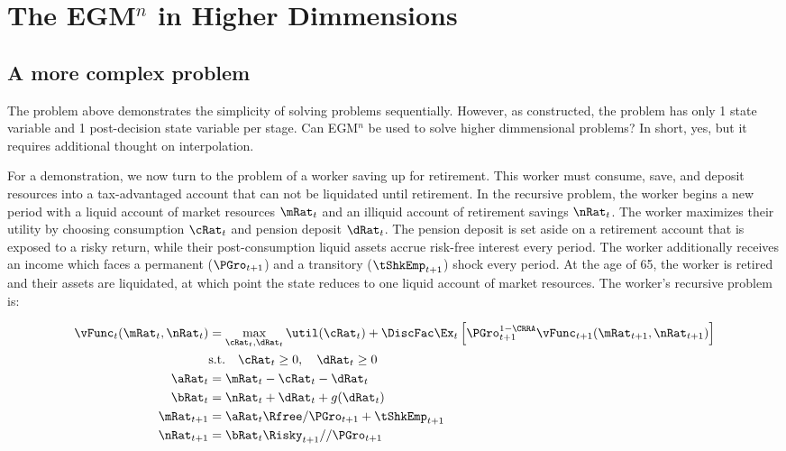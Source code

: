 \documentclass[\econtexRoot/SequentialEGM]{subfiles}
\begin{document}
\hypertarget{parameterizing-the-model}{}\par\section{The EGM$^n$ in Higher Dimmensions}

\subsection{A more complex problem}

The problem above demonstrates the simplicity of solving problems sequentially. However, as constructed, the problem has only 1 state variable and 1 post-decision state variable per stage. Can EGM$^n$ be used to solve higher dimmensional problems? In short, yes, but it requires additional thought on interpolation.

For a demonstration, we now turn to the problem of a worker saving up for retirement. This worker must consume, save, and deposit resources into a tax-advantaged account that can not be liquidated until retirement. In the recursive problem, the worker begins a new period with a liquid account of market resources $\mRat_{t}$ and an illiquid account of retirement savings $\nRat_{t}$. The worker maximizes their utility by choosing consumption $\cRat_{t}$ and pension deposit $\dRat_{t}$. The pension deposit is set aside on a retirement account that is exposed to a risky return, while their post-consumption liquid assets accrue risk-free interest every period. The worker additionally receives an income which faces a permanent ($\PGro_{t+1}$) and a transitory ($\tShkEmp_{t+1}$) shock every period. At the age of 65, the worker is retired and their assets are liquidated, at which point the state reduces to one liquid account of market resources. The worker's recursive problem is:


\begin{equation}
        \begin{split}
                \vFunc_{t}(\mRat_{t}, \nRat_{t}) & = \max_{\cRat_{t}, \dRat_{t}} \util(\cRat_{t}) + \DiscFac \Ex_{t} \left[ \PGro_{t+1}^{1-\CRRA} \vFunc_{t+1}(\mRat_{t+1}, \nRat_{t+1}) \right] \\
                & \text{s.t.} \quad \cRat_{t} \ge 0, \quad \dRat_{t} \ge 0 \\
                \aRat_{t} & = \mRat_{t} - \cRat_{t} - \dRat_{t} \\
                \bRat_{t} & = \nRat_{t} + \dRat_{t} + g(\dRat_{t}) \\
                \mRat_{t+1} & = \aRat_{t} \Rfree / \PGro_{t+1}  + \tShkEmp_{t+1} \\
                \nRat_{t+1} & = \bRat_{t} \Risky_{t+1} / / \PGro_{t+1}
        \end{split}
\end{equation}
\end{document}
